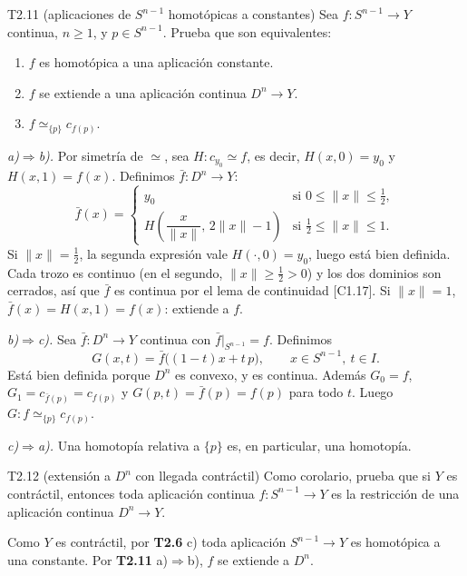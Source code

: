 \begin{ejercicio}{T2.11 (aplicaciones de $S^{n-1}$ homotópicas a constantes)}
Sea $f \colon S^{n-1} \to Y$ continua, $n \geq 1$, y $p \in S^{n-1}$. Prueba que son equivalentes:
\begin{enumerate}
    \item[a)] $f$ es homotópica a una aplicación constante.
    \item[b)] $f$ se extiende a una aplicación continua $D^n \to Y$.
    \item[c)] $f \simeq_{\{p\}} c_{f(p)}$.
\end{enumerate}

\sol \fuentepropia

\emph{a)$\Rightarrow$b).} Por simetría de $\simeq$, sea $H \colon c_{y_0} \simeq f$, es decir, $H(x,0) = y_0$ y $H(x,1) = f(x)$. Definimos $\bar f \colon D^n \to Y$:
\[ \bar f(x) = \begin{cases} y_0 & \text{si } 0 \leq \|x\| \leq \frac12, \\[0.5ex] H\left(\dfrac{x}{\|x\|},\, 2\|x\| - 1\right) & \text{si } \frac12 \leq \|x\| \leq 1. \end{cases} \]
Si $\|x\| = \frac12$, la segunda expresión vale $H(\cdot,0) = y_0$, luego está bien definida. Cada trozo es continuo (en el segundo, $\|x\| \geq \frac12 > 0$) y los dos dominios son cerrados, así que $\bar f$ es continua por el lema de continuidad [C1.17]. Si $\|x\| = 1$, $\bar f(x) = H(x,1) = f(x)$: extiende a $f$.

\emph{b)$\Rightarrow$c).} Sea $\bar f \colon D^n \to Y$ continua con $\bar f|_{S^{n-1}} = f$. Definimos
\[ G(x,t) = \bar f\big((1-t)x + t\,p\big), \qquad x \in S^{n-1},\ t \in I. \]
Está bien definida porque $D^n$ es convexo, y es continua. Además $G_0 = f$, $G_1 = c_{\bar f(p)} = c_{f(p)}$ y $G(p,t) = \bar f(p) = f(p)$ para todo $t$. Luego $G \colon f \simeq_{\{p\}} c_{f(p)}$.

\emph{c)$\Rightarrow$a).} Una homotopía relativa a $\{p\}$ es, en particular, una homotopía.
\end{ejercicio}

\begin{ejercicio}{T2.12 (extensión a $D^n$ con llegada contráctil)}
Como corolario, prueba que si $Y$ es contráctil, entonces toda aplicación continua $f \colon S^{n-1} \to Y$ es la restricción de una aplicación continua $D^n \to Y$.

\sol \fuentepropia

Como $Y$ es contráctil, por \textbf{T2.6} c) toda aplicación $S^{n-1} \to Y$ es homotópica a una constante. Por \textbf{T2.11} a)$\Rightarrow$b), $f$ se extiende a $D^n$.
\end{ejercicio}

